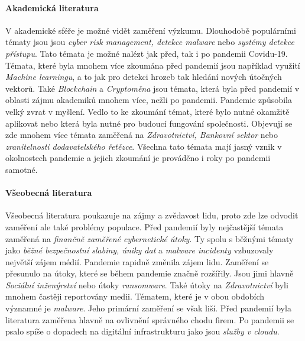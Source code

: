 \paragraph{Akademická literatura}
V akademické sféře je možné vidět zaměření výzkumu.
Dlouhodobě populárními tématy jsou jsou \textit{cyber risk management, detekce malware} nebo \textit{systémy detekce přístupu}.\cite{KUMAR2022102821}
Tato témata je možné nalézt jak před, tak i po pandemii Covidu-19.
Témata, které byla mnohem více zkoumána před pandemií jsou například využití \textit{Machine learningu}, a to jak pro detekci hrozeb tak hledání nových útočných vektorů.
Také \textit{Blockchain} a \textit{Cryptoměna} jsou témata, která byla před pandemií v oblasti zájmu akademiků mnohem více, nežli po pandemii.\cite{KUMAR2022102821}
Pandemie způsobila velký zvrat v myšlení.
Vedlo to ke zkoumání témat, které bylo nutné okamžitě aplikovat nebo která byla nutné pro budoucí fungování společnosti.
Objevují se zde mnohem více témata zaměřená na \textit{Zdravotnictví, Bankovní sektor} nebo \textit{zranitelnosti dodavatelského řetězce}.\cite{KUMAR2022102821}
Všechna tato témata mají jasný vznik v okolnostech pandemie a jejich zkoumání je prováděno i roky po pandemii samotné.

\paragraph{Všeobecná literatura}
Všeobecná literatura poukazuje na zájmy a zvědavost lidu, proto zde lze odvodit zaměření ale také problémy populace.
Před pandemií byly nejčastější témata zaměřená na \textit{finančně zaměřené cybernetické útoky}.
Ty spolu s běžnými tématy jako \textit{běžné bezpečnostní slabiny, úniky dat} a \textit{malware incidenty} vzbuzovaly největší zájem médií.\cite{KUMAR2022102821}
Pandemie rapidně změnila zájem lidu.
Zaměření se přesunulo na útoky, které se během pandemie značně rozšířily.
Jsou jimi hlavně \textit{Sociální inženýrství} nebo útoky \textit{ransomware}.
Také útoky na \textit{Zdravotnictví} byli mnohem častěji reportovány medii.
Tématem, které je v obou obdobích významné je \textit{malware}.
Jeho primární zaměření se však liší.
Před pandemií byla literatura zaměřena hlavně na ovlivnění správného chodu firem.
Po pandemii se psalo spíše o dopadech na digitální infrastrukturu jako jsou \textit{služby v cloudu}.


